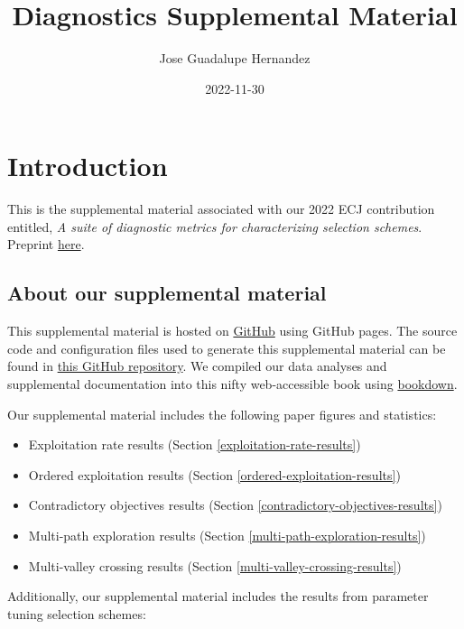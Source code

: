 \documentclass[]{book}
\title{Diagnostics Supplemental Material}
\author{Jose Guadalupe Hernandez}
\date{2022-11-30}
\providecommand{\tightlist}{%
  \setlength{\itemsep}{0pt}\setlength{\parskip}{0pt}}
\begin{document}
\maketitle

{
\setcounter{tocdepth}{1}
\tableofcontents
}
\hypertarget{introduction}{%
\chapter{Introduction}\label{introduction}}

This is the supplemental material associated with our 2022 ECJ contribution entitled, \emph{A suite of diagnostic metrics for characterizing selection schemes}.
Preprint \href{https://arxiv.org/pdf/2204.13839.pdf}{here}.

\hypertarget{about-our-supplemental-material}{%
\section{About our supplemental material}\label{about-our-supplemental-material}}

This supplemental material is hosted on \href{https://github.com}{GitHub} using GitHub pages.
The source code and configuration files used to generate this supplemental material can be found in \href{https://github.com/jgh9094/ECJ-2022-suite-of-diagnostics-for-selection-schemes}{this GitHub repository}.
We compiled our data analyses and supplemental documentation into this nifty web-accessible book using \href{https://bookdown.org/}{bookdown}.

Our supplemental material includes the following paper figures and statistics:

\begin{itemize}
\tightlist
\item
  Exploitation rate results (Section \ref{exploitation-rate-results})
\item
  Ordered exploitation results (Section \ref{ordered-exploitation-results})
\item
  Contradictory objectives results (Section \ref{contradictory-objectives-results})
\item
  Multi-path exploration results (Section \ref{multi-path-exploration-results})
\item
  Multi-valley crossing results (Section \ref{multi-valley-crossing-results})
\end{itemize}

Additionally, our supplemental material includes the results from parameter tuning selection schemes:
\end{document}
